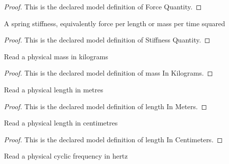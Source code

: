\begin{proof}
  This is the declared model definition of Force Quantity.
\end{proof}
\begin{definition}
  \label{def:physics:phyx-mini-0231:phyxminiproblems-problemphyxmini0231-stiffnessquantity}
  A spring stiffness, equivalently force per length or mass per time squared
\end{definition}
\begin{proof}
  This is the declared model definition of Stiffness Quantity.
\end{proof}
\begin{definition}
  \label{def:physics:phyx-mini-0231:phyxminiproblems-problemphyxmini0231-massinkilograms}
  Read a physical mass in kilograms
\end{definition}
\begin{proof}
  This is the declared model definition of mass In Kilograms.
\end{proof}
\begin{definition}
  \label{def:physics:phyx-mini-0231:phyxminiproblems-problemphyxmini0231-lengthinmeters}
  Read a physical length in metres
\end{definition}
\begin{proof}
  This is the declared model definition of length In Meters.
\end{proof}
\begin{definition}
  \label{def:physics:phyx-mini-0231:phyxminiproblems-problemphyxmini0231-lengthincentimeters}
  Read a physical length in centimetres
\end{definition}
\begin{proof}
  This is the declared model definition of length In Centimeters.
\end{proof}
\begin{definition}
  \label{def:physics:phyx-mini-0231:phyxminiproblems-problemphyxmini0231-frequencyinhertz}
  Read a physical cyclic frequency in hertz
\end{definition}
